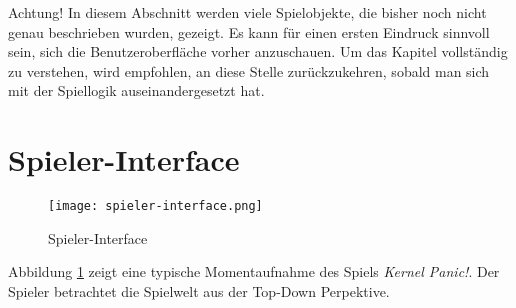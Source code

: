 Achtung! In diesem Abschnitt werden viele Spielobjekte, die bisher noch nicht genau beschrieben wurden, gezeigt. Es kann für einen ersten Eindruck sinnvoll sein, sich die Benutzeroberfläche vorher anzuschauen. Um das Kapitel vollständig zu verstehen, wird empfohlen, an diese Stelle zurückzukehren, sobald man sich mit der Spiellogik auseinandergesetzt hat.
\section{Spieler-Interface}
%
%
%
%
%
%
%
%
\begin{figure}[ht]
	\centering
	\texttt{[image: spieler-interface.png]}
	\caption{Spieler-Interface}
	\label{fig:spieler-interface}
\end{figure}
\pagebreak\noindent
Abbildung \ref{fig:spieler-interface} zeigt eine typische Momentaufnahme des Spiels \textit{Kernel Panic!}.
Der Spieler betrachtet die Spielwelt aus der Top-Down Perpektive.

